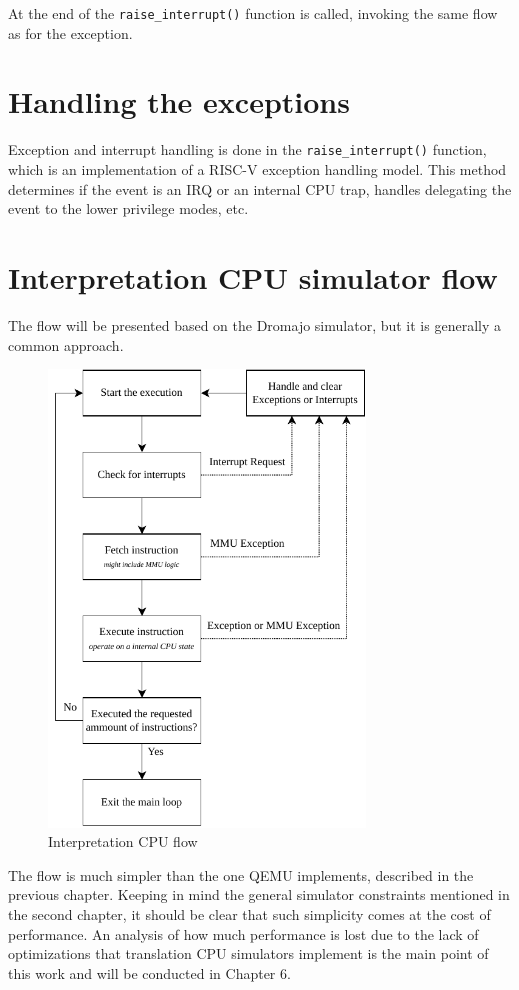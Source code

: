 \noindent
At the end of the \texttt{raise\_interrupt()} function is called, invoking the same flow as for the exception.

\section*{Handling the exceptions}

Exception and interrupt handling is done in the \texttt{raise\_interrupt()} function, which is an implementation of
a RISC-V exception handling model. This method determines if the event is an IRQ or an internal CPU trap, handles
delegating the event to the lower privilege modes, etc.

\pagebreak

\section{Interpretation CPU simulator flow}

The flow will be presented based on the Dromajo simulator, but it is generally a common approach.

\begin{figure}[h]
	\centering
	\includegraphics[width=0.75\textwidth]{figures/DromajoFlow.pdf}
	\caption{Interpretation CPU flow}
\end{figure}

\noindent
The flow is much simpler than the one QEMU implements, described in the previous chapter. Keeping in mind the general
simulator constraints mentioned in the second chapter, it should be clear that such simplicity comes at the cost of
performance. An analysis of how much performance is lost due to the lack of optimizations that translation CPU simulators
implement is the main point of this work and will be conducted in Chapter 6.
